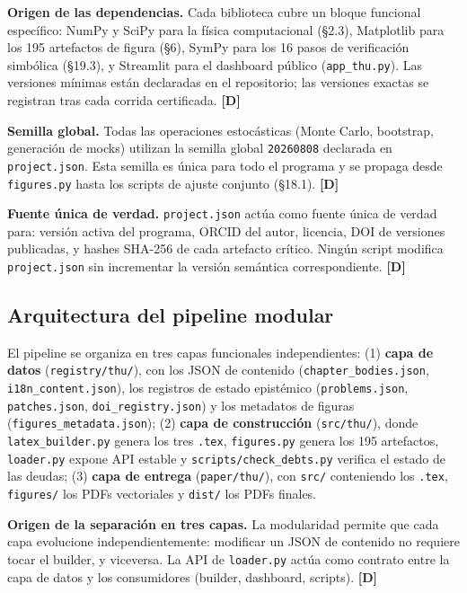 ﻿\documentclass[11pt,letterpaper]{article}
\begin{document}
\textbf{Origen de las dependencias.} Cada biblioteca cubre un bloque funcional específico: NumPy y SciPy para la física computacional (§2.3), Matplotlib para los 195 artefactos de figura (§6), SymPy para los 16 pasos de verificación simbólica (§19.3), y Streamlit para el dashboard público (\texttt{app\_thu.py}). Las versiones mínimas están declaradas en el repositorio; las versiones exactas se registran tras cada corrida certificada. \textbf{[D]}

\textbf{Semilla global.} Todas las operaciones estocásticas (Monte Carlo, bootstrap, generación de mocks) utilizan la semilla global \texttt{20260808} declarada en \texttt{project.json}. Esta semilla es única para todo el programa y se propaga desde \texttt{figures.py} hasta los scripts de ajuste conjunto (§18.1). \textbf{[D]}

\textbf{Fuente única de verdad.} \texttt{project.json} actúa como fuente única de verdad para: versión activa del programa, ORCID del autor, licencia, DOI de versiones publicadas, y hashes SHA-256 de cada artefacto crítico. Ningún script modifica \texttt{project.json} sin incrementar la versión semántica correspondiente. \textbf{[D]}
\subsection{Arquitectura del pipeline modular}
El pipeline se organiza en tres capas funcionales independientes: (1) \textbf{capa de datos} (\texttt{registry/thu/}), con los JSON de contenido (\texttt{chapter\_bodies.json}, \texttt{i18n\_content.json}), los registros de estado epistémico (\texttt{problems.json}, \texttt{patches.json}, \texttt{doi\_registry.json}) y los metadatos de figuras (\texttt{figures\_metadata.json}); (2) \textbf{capa de construcción} (\texttt{src/thu/}), donde \texttt{latex\_builder.py} genera los tres \texttt{.tex}, \texttt{figures.py} genera los 195 artefactos, \texttt{loader.py} expone API estable y \texttt{scripts/check\_debts.py} verifica el estado de las deudas; (3) \textbf{capa de entrega} (\texttt{paper/thu/}), con \texttt{src/} conteniendo los \texttt{.tex}, \texttt{figures/} los PDFs vectoriales y \texttt{dist/} los PDFs finales.

\textbf{Origen de la separación en tres capas.} La modularidad permite que cada capa evolucione independientemente: modificar un JSON de contenido no requiere tocar el builder, y viceversa. La API de \texttt{loader.py} actúa como contrato entre la capa de datos y los consumidores (builder, dashboard, scripts). \textbf{[D]}
\end{document}
